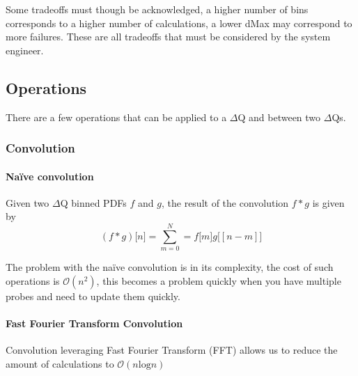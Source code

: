 Some tradeoffs must though be acknowledged, a higher number of bins corresponds to a higher number of calculations, a lower dMax may correspond to more failures. These are all tradeoffs that must be considered by the system engineer.

\subsection{Operations}

There are a few operations that can be applied to a $\Delta$Q and between two $\Delta$Qs.

        \subsubsection{Convolution}
        
        \paragraph{Naïve convolution}
        Given two $\Delta$Q binned PDFs $f$ and $g$, the result of the convolution $f * g$ is given by 
        \begin{equation}
            (f * g)\lbrack n \rbrack = \sum_{m = 0}^{N} = f\lbrack m \rbrack g \lbrack [n - m] \rbrack  
            \label{eq:discconv}
        \end{equation}

        The problem with the naïve convolution is in its complexity, the cost of such operations is $\mathcal{O}(n^2)$, this becomes a problem quickly when you have multiple probes and need to update them quickly. 

        \paragraph{Fast Fourier Transform Convolution}

        Convolution leveraging Fast Fourier Transform (FFT) allows us to reduce the amount of calculations to $\mathcal{O}(n \text{log} n)$ 
